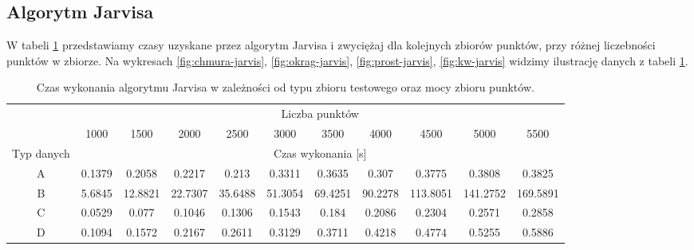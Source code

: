 \documentclass[11pt]{article}
\theoremstyle{remark} \newtheorem{definition}{def.}
\theoremstyle{definition} \newtheorem{twierdzenie}{tw.}
\begin{document}
\subsection{Algorytm Jarvisa}

W tabeli \ref{tab:jarvis} przedstawiamy czasy uzyskane przez algorytm Jarvisa i zwyciężaj dla kolejnych zbiorów punktów, przy różnej liczebności punktów w zbiorze. Na wykresach \ref{fig:chmura-jarvis}, 
\ref{fig:okrag-jarvis}, \ref{fig:prost-jarvis}, \ref{fig:kw-jarvis} widzimy ilustrację danych z tabeli \ref{tab:jarvis}.

\begin{table}[]
\centering
\caption{Czas wykonania algorytmu Jarvisa w zależności od typu zbioru testowego oraz mocy zbioru punktów.}
\label{tab:jarvis}
\begin{tabular}{c|c|c|c|c|c|c|c|c|c|c|}
\cline{2-11}
\multicolumn{1}{l|}{} & \multicolumn{10}{c|}{Liczba punktów} \\ \cline{2-11} 
\multicolumn{1}{l|}{} & 1000 & 1500 & 2000 & 2500 & 3000 & 3500 & 4000 & 4500 & 5000 & 5500 \\ \hline
\multicolumn{1}{|c|}{Typ danych} & \multicolumn{10}{c|}{Czas wykonania {[}s{]}} \\ \hline
\multicolumn{1}{|c|}{A} & 0.1379 & 0.2058 & 0.2217 & 0.213 & 0.3311 & 0.3635 & 0.307 & 0.3775 & 0.3808 & 0.3825 \\ \hline
\multicolumn{1}{|c|}{B} & 5.6845 & 12.8821 & 22.7307 & 35.6488 & 51.3054 & 69.4251 & 90.2278 & 113.8051 & 141.2752 & 169.5891 \\ \hline
\multicolumn{1}{|c|}{C} & 0.0529 & 0.077 & 0.1046 & 0.1306 & 0.1543 & 0.184 & 0.2086 & 0.2304 & 0.2571 & 0.2858 \\ \hline
\multicolumn{1}{|c|}{D} & 0.1094 & 0.1572 & 0.2167 & 0.2611 & 0.3129 & 0.3711 & 0.4218 & 0.4774 & 0.5255 & 0.5886 \\ \hline
\end{tabular}
\end{table}
\end{document}

